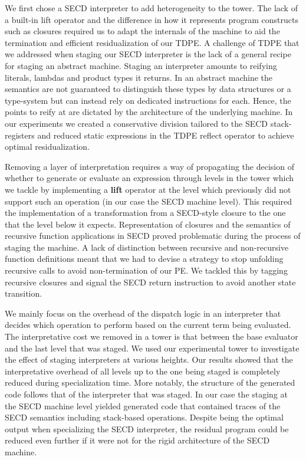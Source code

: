 \documentclass[a4paper,12pt,twoside,openright]{report}
\theoremstyle{definition}
\begin{document}
We first chose a SECD interpreter to add heterogeneity to the tower. The lack of a built-in lift operator and the difference in how it represents program constructs such as closures required us to adapt the internals of the machine to aid the termination and efficient residualization of our TDPE. A challenge of TDPE that we addressed when staging our SECD interpreter is the lack of a general recipe for staging an abstract machine. Staging an interpreter amounts to reifying literals, lambdas and product types it returns. In an abstract machine the semantics are not guaranteed to distinguish these types by data structures or a type-system but can instead rely on dedicated instructions for each. Hence, the points to reify at are dictated by the architecture of the underlying machine. In our experiments we created a conservative division tailored to the SECD stack-registers and reduced static expressions in the TDPE reflect operator to achieve optimal residualization.

Removing a layer of interpretation requires a way of propagating the decision of whether to generate or evaluate an expression through levels in the tower which we tackle by implementing a \textbf{lift} operator at the level which previously did not support such an operation (in our case the SECD machine level). This required the implementation of a transformation from a SECD-style closure to the one that the level below it expects.
Representation of closures and the semantics of recursive function applications in SECD proved problematic during the process of staging the machine. A lack of distinction between recursive and non-recursive function definitions meant that we had to devise a strategy to stop unfolding recursive calls to avoid non-termination of our PE. We tackled this by tagging recursive closures and signal the SECD return instruction to avoid another state transition.

We mainly focus on the overhead of the dispatch logic in an interpreter that decides which operation to perform based on the current term being evaluated. The interpretative cost we removed in a tower is that between the base evaluator and the last level that was staged. We used our experimental tower to investigate the effect of staging interpreters at various heights. Our results showed that the interpretative overhead of all levels up to the one being staged is completely reduced during specialization time. More notably, the structure of the generated code follows that of the interpreter that was staged. In our case the staging at the SECD machine level yielded generated code that contained traces of the SECD semantics including stack-based operations. Despite being the optimal output when specializing the SECD interpreter, the residual program could be reduced even further if it were not for the rigid architecture of the SECD machine.
\end{document}
